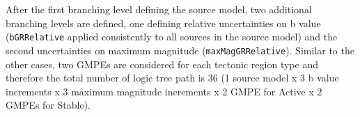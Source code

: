 After the first branching level defining the source model, two additional
branching levels are defined, one defining relative uncertainties on b value
(\texttt{bGRRelative} applied consistently to all sources in the source
model) and the second uncertainties on maximum magnitude
(\texttt{maxMagGRRelative}). Similar to the other cases, two GMPEs are
considered for each tectonic region type and therefore the total number of
logic tree path is 36 (1 source model x 3 b value increments x 3 maximum
magnitude increments x 2 GMPE for Active x 2 GMPEs for Stable).
